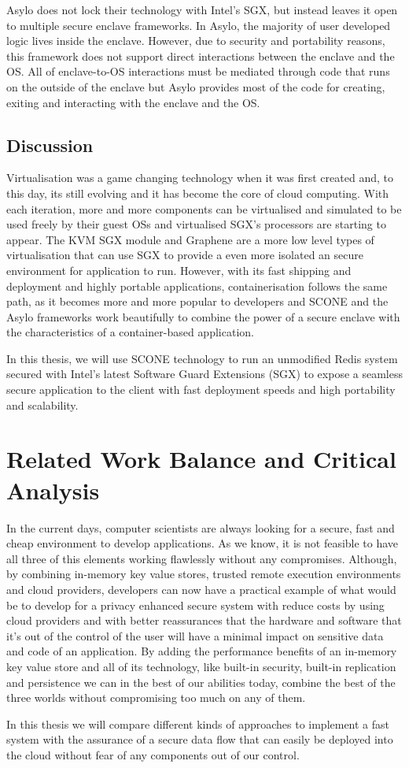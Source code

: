 Asylo does not lock their technology with Intel's \gls{SGX}, but instead leaves it open to multiple secure enclave frameworks. In Asylo, the majority of user developed logic lives inside the enclave. However, due to security and portability reasons, this framework does not support direct interactions between the enclave and the \gls{OS}. All of enclave-to-OS interactions must be mediated through code that runs on the outside of the enclave but Asylo provides most of the code for creating, exiting and interacting with the enclave and the \gls{OS}.

\subsection{Discussion}
\label{ssec:s4_discussion}

Virtualisation was a game changing technology when it was first created and, to this day, its still evolving and it has become the core of cloud computing. With each iteration, more and more components can be virtualised and simulated to be used freely by their guest \glspl{OS} and virtualised SGX's processors are starting to appear. The \gls{KVM} \gls{SGX} module and Graphene are a more low level types of virtualisation that can use \gls{SGX} to provide a even more isolated an secure environment for application to run. However, with its fast shipping and deployment and highly portable applications, containerisation follows the same path, as it becomes more and more popular to developers and SCONE and the Asylo frameworks work beautifully to combine the power of a secure enclave with the characteristics of a container-based application.

In this thesis, we will use SCONE technology to run an unmodified Redis system secured with Intel's latest Software Guard Extensions (\gls{SGX}) to expose a seamless secure application to the client with fast deployment speeds and high portability and scalability.

\section{Related Work Balance and Critical Analysis}
\label{sec:related_work_balance_and_critical_analysis}

In the current days, computer scientists are always looking for a secure, fast and cheap environment to develop applications. As we know, it is not feasible to have all three of this elements working flawlessly without any compromises. Although, by combining in-memory key value stores, trusted remote execution environments and cloud providers, developers can now have a practical example of what would be to develop for a privacy enhanced secure system with reduce costs by using cloud providers and with better reassurances that the hardware and software that it's out of the control of the user will have a minimal impact on sensitive data and code of an application. By adding the performance benefits of an in-memory key value store and all of its technology, like built-in security, built-in replication and persistence we can in the best of our abilities today, combine the best of the three worlds without compromising too much on any of them.

In this thesis we will compare different kinds of approaches to implement a fast system with the assurance of a secure data flow that can easily be deployed into the cloud without fear of any components out of our control.